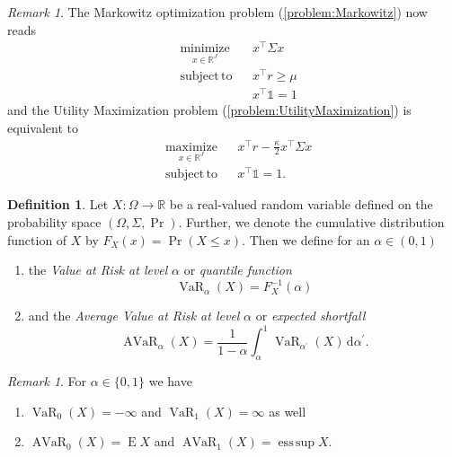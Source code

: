 \documentclass[a4paper, english, 11pt, onecolumn, oneside, final]{article}
\numberwithin{equation}{section}   %
\DeclareMathOperator{\E}{\mathrm{E}}	    %
\DeclareMathOperator*{\esssup}{ess\,sup}    %
\DeclareMathOperator{\VaR}{\mathrm{VaR}}	%
\DeclareMathOperator{\AVaR}{\mathrm{AVaR}}	%
\newcommand{\R}{\mathbb{R}}                 %
\newcommand{\one}{\mathds 1}
\theoremstyle{plain}
\theoremstyle{definition}
\newtheorem{definition} [theorem]{Definition}
\theoremstyle{remark}
\newtheorem{remark}     [theorem]{Remark}
\begin{document}
\begin{remark}
    The Markowitz optimization problem (\ref{problem:Markowitz}) now reads
    \begin{equation}
    \label{problem:MarkowitzNew}
        \begin{aligned}
            & \underset{x\in\R^J}{\mathrm{minimize}} & & x^\top\Sigma x \\
            & \mathrm{subject\,to} & & x^\top r \geq \mu \\
            & & & x^\top\one = 1
        \end{aligned}
    \end{equation}
    and the Utility Maximization problem (\ref{problem:UtilityMaximization}) is equivalent to
    \begin{equation}
    \label{problem:UtilityMaximizationNew}
        \begin{aligned}
            & \underset{x\in\R^J}{\mathrm{maximize}} & & x^\top r - \frac{\kappa}{2}x^\top\Sigma x \\
            & \mathrm{subject\,to} & & x^\top\one = 1.
        \end{aligned}
    \end{equation}
\end{remark}
\begin{definition}
Let $X\colon\Omega\to\R$ be a real-valued random variable defined on the probability space $(\Omega,\Sigma,\Pr)$. Further, we denote the cumulative distribution function of $X$ by $F_X(x)=\Pr(X\leq x)$. Then we define for an $\alpha\in(0,1)$
    \begin{enumerate}[\itshape(i)]
        \item the \emph{Value at Risk at level} $\alpha$ or\emph{ quantile function}
        \begin{equation*}
            \VaR_\alpha(X) = F_X^{-1}(\alpha)
        \end{equation*}
        \item and the \emph{Average Value at Risk at level} $\alpha$ or \emph{expected shortfall}
        \begin{equation*}
            \AVaR_\alpha(X) = \frac{1}{1-\alpha}\int_\alpha^1\VaR_{\alpha^\prime}(X)\,\mathrm{d}\alpha^\prime.
        \end{equation*}
    \end{enumerate}
\end{definition}
\begin{remark}
    For $\alpha\in\{0,1\}$ we have
    \begin{enumerate}[\itshape(i)]
        \item $\VaR_0(X) = -\infty$ and $\VaR_1(X) = \infty$ as well
        \item $\AVaR_0(X) = \E X$ and $\AVaR_1(X) = \esssup X$.
    \end{enumerate}
\end{remark}
\end{document}
